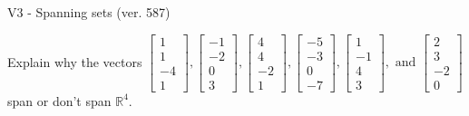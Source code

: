 \begin{exercise}
  \begin{exerciseTitle}V3 - Spanning sets (ver. 587)\end{exerciseTitle}
  \begin{exerciseStatement}
    Explain why the vectors \(\left[\begin{array}{r}
1 \\
1 \\
-4 \\
1
\end{array}\right] , \left[\begin{array}{r}
-1 \\
-2 \\
0 \\
3
\end{array}\right] , \left[\begin{array}{r}
4 \\
4 \\
-2 \\
1
\end{array}\right] , \left[\begin{array}{r}
-5 \\
-3 \\
0 \\
-7
\end{array}\right] , \left[\begin{array}{r}
1 \\
-1 \\
4 \\
3
\end{array}\right] , \text{ and } \left[\begin{array}{r}
2 \\
3 \\
-2 \\
0
\end{array}\right]\) span or don't span \(\mathbb{R}^4\). 
	



\end{exerciseStatement}
\end{exercise}
